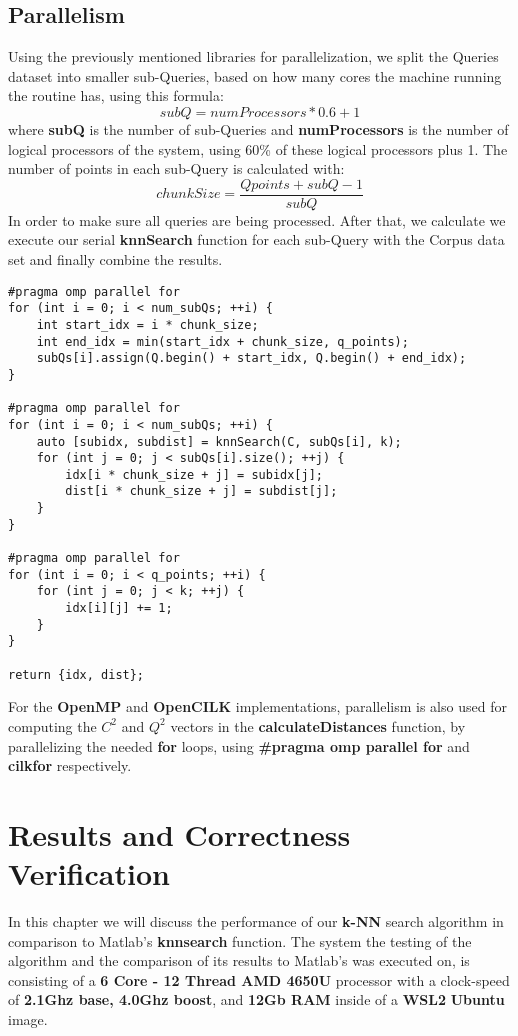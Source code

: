 \documentclass[12pt]{report}
\begin{document}
\section{Parallelism}
Using the previously mentioned libraries for parallelization, we split the Queries dataset into smaller sub-Queries, based on how many cores the machine running the routine has, using this formula:
\[
subQ = numProcessors * 0.6 + 1
\]
where \textbf{subQ} is the number of sub-Queries and \textbf{numProcessors} is the number of logical processors of the system, using 60\% of these logical processors plus 1.
The number of points in each sub-Query is calculated with:
\[
chunkSize = \dfrac{Qpoints + subQ - 1}{subQ}
\]
In order to make sure all queries are being processed. After that, we calculate we execute our serial \textbf{knnSearch} function for each sub-Query with the Corpus data set and finally combine the results.
\begin{lstlisting}[style=cppstyle]
#pragma omp parallel for
for (int i = 0; i < num_subQs; ++i) {
    int start_idx = i * chunk_size;
    int end_idx = min(start_idx + chunk_size, q_points);
    subQs[i].assign(Q.begin() + start_idx, Q.begin() + end_idx);
}

#pragma omp parallel for
for (int i = 0; i < num_subQs; ++i) {
    auto [subidx, subdist] = knnSearch(C, subQs[i], k);
    for (int j = 0; j < subQs[i].size(); ++j) {
        idx[i * chunk_size + j] = subidx[j];
        dist[i * chunk_size + j] = subdist[j];
    }
}

#pragma omp parallel for
for (int i = 0; i < q_points; ++i) {
    for (int j = 0; j < k; ++j) {
        idx[i][j] += 1;
    }
}

return {idx, dist};
\end{lstlisting}
For the \textbf{OpenMP} and \textbf{OpenCILK} implementations, parallelism is also used for computing the \(C^2\) and \(Q^2\) vectors in the \textbf{calculateDistances} function, by parallelizing the needed \textbf{for} loops, using \textbf{\#pragma omp parallel for} and \textbf{cilk\textunderscore for} respectively. 

\chapter{Results and Correctness Verification}
In this chapter we will discuss the performance of our \textbf{k-NN} search algorithm in comparison to Matlab's \textbf{knnsearch} function. The system the testing of the algorithm and the comparison of its results to Matlab's was executed on, is consisting of a \textbf{6 Core - 12 Thread AMD 4650U} processor with a clock-speed of \textbf{2.1Ghz base, 4.0Ghz boost}, and \textbf{12Gb RAM} inside of a \textbf{WSL2} \textbf{Ubuntu} image.
\end{document}
